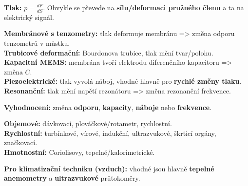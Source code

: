 \documentclass[12pt]{article}
\newcounter{chapternumber}
\newcounter{questionnumber}
\renewcommand{\thequestionnumber}{\arabic{chapternumber}.\arabic{questionnumber}}
\begin{document}
\begin{tcolorbox}[title={\stepcounter{questionnumber}\thequestionnumber. Jaké znáte senzory tlaku plynu? (druhy, na základě čeho se tlak obvykle měří, jak se to vyhodnocuje?) (31–41)}]
\textbf{Tlak:} $p=\frac{dF}{dS}$. Obvykle se převede na \textbf{sílu/deformaci pružného členu} a ta na elektrický signál.

\textbf{Membránové s tenzometry:} tlak deformuje membránu => změna odporu tenzometrů v můstku.\\
\textbf{Trubicové deformační:} Bourdonova trubice, tlak mění tvar/polohu.\\
\textbf{Kapacitní MEMS:} membrána tvoří elektrodu diferenčního kapacitoru => změna $C$.\\
\textbf{Piezoelektrické:} tlak vyvolá náboj, vhodné hlavně pro \textbf{rychlé změny tlaku}.\\
\textbf{Resonanční:} tlak mění napětí rezonátoru => změna rezonanční frekvence.

\textbf{Vyhodnocení:} změna \textbf{odporu}, \textbf{kapacity}, \textbf{náboje} nebo \textbf{frekvence}.
\end{tcolorbox}

\begin{tcolorbox}[title={\stepcounter{questionnumber}\thequestionnumber. Uveďte základní typy průtokoměrů. Které se hodí na měření průtoku vzduchu v klimatizační technice? (46–49)}]
\textbf{Objemové:} dávkovací, plováčkové/rotametr, rychlostní.\\
\textbf{Rychlostní:} turbínkové, vírové, indukční, ultrazvukové, škrticí orgány, značkovací.\\
\textbf{Hmotnostní:} Coriolisovy, tepelné/kalorimetrické.

\textbf{Pro klimatizační techniku (vzduch):}  
vhodné jsou hlavně \textbf{tepelné anemometry} a \textbf{ultrazvukové} průtokoměry.
\end{tcolorbox}
\end{document}
